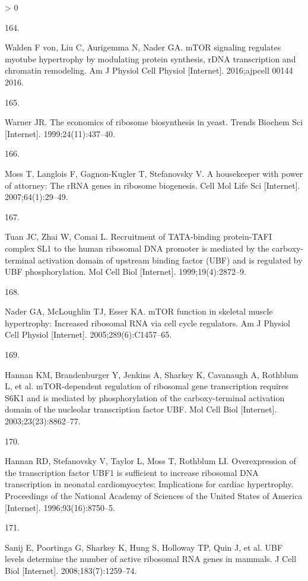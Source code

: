 \documentclass[twoside,10pt]{gihclass} %
\newlength{\cslhangindent}
\newlength{\csllabelwidth}
\newenvironment{CSLReferences}[3] %
 {%
  \setlength{\parindent}{0pt}
  \ifodd #1 \everypar{\setlength{\hangindent}{\cslhangindent}}\ignorespaces\fi
  \ifnum #2 > 0
  \setlength{\parskip}{#2\baselineskip}
  \fi
 }%
 {}
\newcommand{\CSLLeftMargin}[1]{\parbox[t]{\maxof{\widthof{#1}}{\csllabelwidth}}{#1}}
\newcommand{\CSLRightInline}[1]{\parbox[t]{\linewidth}{#1}}
\begin{document}
\begin{CSLReferences}{0}{0}
\leavevmode\hypertarget{ref-RN1810}{}%
\CSLLeftMargin{164. }
\CSLRightInline{Walden F von, Liu C, Aurigemma N, Nader GA. mTOR signaling regulates myotube hypertrophy by modulating protein synthesis, rDNA transcription and chromatin remodeling. Am J Physiol Cell Physiol {[}Internet{]}. 2016;ajpcell 00144 2016. }

\leavevmode\hypertarget{ref-RN1920}{}%
\CSLLeftMargin{165. }
\CSLRightInline{Warner JR. The economics of ribosome biosynthesis in yeast. Trends Biochem Sci {[}Internet{]}. 1999;24(11):437--40. }

\leavevmode\hypertarget{ref-RN1820}{}%
\CSLLeftMargin{166. }
\CSLRightInline{Moss T, Langlois F, Gagnon-Kugler T, Stefanovsky V. A housekeeper with power of attorney: The rRNA genes in ribosome biogenesis. Cell Mol Life Sci {[}Internet{]}. 2007;64(1):29--49. }

\leavevmode\hypertarget{ref-RN2582}{}%
\CSLLeftMargin{167. }
\CSLRightInline{Tuan JC, Zhai W, Comai L. Recruitment of TATA-binding protein-TAFI complex SL1 to the human ribosomal DNA promoter is mediated by the carboxy-terminal activation domain of upstream binding factor (UBF) and is regulated by UBF phosphorylation. Mol Cell Biol {[}Internet{]}. 1999;19(4):2872--9. }

\leavevmode\hypertarget{ref-RN1632}{}%
\CSLLeftMargin{168. }
\CSLRightInline{Nader GA, McLoughlin TJ, Esser KA. mTOR function in skeletal muscle hypertrophy: Increased ribosomal RNA via cell cycle regulators. Am J Physiol Cell Physiol {[}Internet{]}. 2005;289(6):C1457--65. }

\leavevmode\hypertarget{ref-RN2564}{}%
\CSLLeftMargin{169. }
\CSLRightInline{Hannan KM, Brandenburger Y, Jenkins A, Sharkey K, Cavanaugh A, Rothblum L, et al. mTOR-dependent regulation of ribosomal gene transcription requires S6K1 and is mediated by phosphorylation of the carboxy-terminal activation domain of the nucleolar transcription factor UBF. Mol Cell Biol {[}Internet{]}. 2003;23(23):8862--77. }

\leavevmode\hypertarget{ref-RN2566}{}%
\CSLLeftMargin{170. }
\CSLRightInline{Hannan RD, Stefanovsky V, Taylor L, Moss T, Rothblum LI. Overexpression of the transcription factor UBF1 is sufficient to increase ribosomal DNA transcription in neonatal cardiomyocytes: Implications for cardiac hypertrophy. Proceedings of the National Academy of Sciences of the United States of America {[}Internet{]}. 1996;93(16):8750--5. }

\leavevmode\hypertarget{ref-RN2556}{}%
\CSLLeftMargin{171. }
\CSLRightInline{Sanij E, Poortinga G, Sharkey K, Hung S, Holloway TP, Quin J, et al. UBF levels determine the number of active ribosomal RNA genes in mammals. J Cell Biol {[}Internet{]}. 2008;183(7):1259--74. }


\end{CSLReferences}
\end{document}
